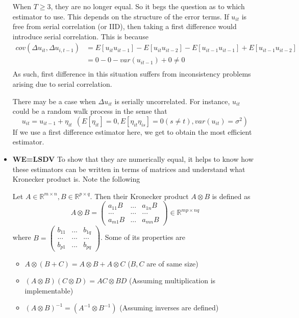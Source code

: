 \begin{itemize}
When $T\geq3$, they are no longer equal. So it begs the question as to which estimator to use. This depends on the structure of the error terms. If $u_{it}$ is free from serial correlation (or IID), then taking a first difference would introduce serial correlation. This is because
\[
\begin{aligned}
cov(\Delta u_{it},\Delta u_{i,t-1})&=E[u_{it}u_{it-1}]-E[u_{it}u_{it-2}]-E[u_{it-1}u_{it-1}]+E[u_{it-1}u_{it-2}]\\
&=0-0-var(u_{it-1})+0\neq 0 \\
\end{aligned}
\]
As such, first difference in this situation suffers from inconsistency problems arising due to serial correlation. \par
There may be a case when $\Delta u_{it}$ is serially uncorrelated. For instance, $u_{it}$ could be a random walk process in the sense that
\[
u_{it}=u_{it-1}+\eta_{it} \ \ (E[\eta_{it}]=0, E[\eta_{it}\eta_{is}]=0 (s\neq t), var(u_{it})=\sigma^2)
\]
If we use a first difference estimator here, we get to obtain the most efficient estimator. 
\item \textbf{WE=LSDV} To show that they are numerically equal, it helps to know how these estimators can be written in terms of matrices and understand what Kronecker product is. Note the following
\begin{mdframed}[backgroundcolor=blue!5] 
\begin{definition} 
Let $A\in\mathbb{R}^{m\times n}, B\in\mathbb{R}^{p\times q}$. Then their Kronecker product $A\otimes B$ is defined as
\[
A\otimes B = \begin{pmatrix}a_{11}B & ... &a_{1n}B\\ ...&...&...\\a_{m1}B &...&a_{mn}B \end{pmatrix}\in\mathbb{R}^{mp\times nq}
\]
where $B=\begin{pmatrix}b_{11} & ... &b_{1q}\\ ...&...&...\\b_{p1} &...&b_{pq} \end{pmatrix}$. Some of its properties are
\begin{itemize}
\item $A\otimes(B+C)=A\otimes B + A\otimes C$ ($B,C$ are of same size)
\item $(A\otimes B)(C\otimes D)=AC\otimes BD$ (Assuming multiplication is implementable)
\item $(A\otimes B)^{-1}= (A^{-1}\otimes B^{-1})$ (Assuming inverses are defined)

\end{itemize}
\end{definition}
\end{mdframed}
\end{itemize}
